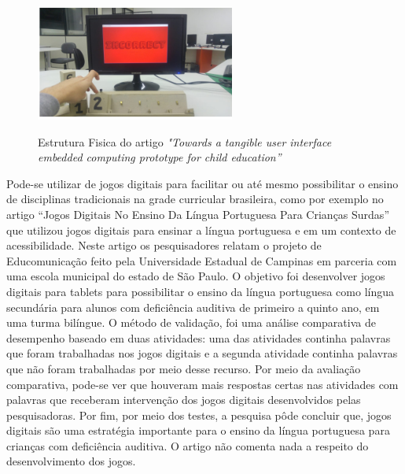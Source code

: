 \begin{figure}[H]
    \caption{Estrutura Fisica do artigo \textit{"Towards a tangible user interface embedded computing prototype for child education”}}
    \centering
        \includegraphics[width=\linewidth]{Imagens/cap2/estrutura_artigo_towards.png}
    \label{figura:estrutura_artigo_towards}
\end{figure}

Pode-se utilizar de jogos digitais para facilitar ou até mesmo possibilitar o ensino de disciplinas tradicionais na grade curricular brasileira, como por exemplo no artigo “Jogos Digitais No Ensino Da Língua Portuguesa Para Crianças Surdas” \cite{liz_2017} que utilizou jogos digitais para ensinar a língua portuguesa e em um contexto de acessibilidade. Neste artigo os pesquisadores relatam o projeto de Educomunicação feito pela Universidade Estadual de Campinas em parceria com uma escola municipal do estado de São Paulo. O objetivo foi desenvolver jogos digitais para tablets para possibilitar o ensino da língua portuguesa como língua secundária para alunos com deficiência auditiva de primeiro a quinto ano, em uma turma bilíngue. O método de validação, foi uma análise comparativa de desempenho baseado em duas atividades: uma das atividades continha palavras que foram trabalhadas nos jogos digitais e a segunda atividade continha palavras que não foram trabalhadas por meio desse recurso. Por meio da avaliação comparativa, pode-se ver que houveram mais respostas certas nas atividades com palavras que receberam intervenção dos jogos digitais desenvolvidos pelas pesquisadoras. Por fim, por meio dos testes, a  pesquisa pôde concluir que, jogos digitais são uma estratégia importante para o ensino da língua portuguesa para crianças com deficiência auditiva. O artigo não comenta nada a respeito do desenvolvimento dos jogos.

